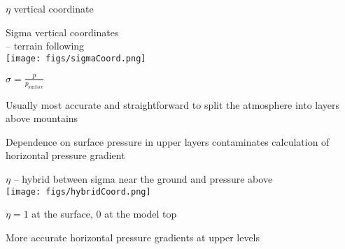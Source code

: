 \begin{slide}

\begin{list1}
\item $\eta$ vertical coordinate

\begin{minipage}[t]{0.48\linewidth}\centering
Sigma vertical coordinates \\ \hspace{1cm}-- terrain following \\
\texttt{[image: figs/sigmaCoord.png]}
\begin{list2}
\item $\sigma=\frac{p}{p_\text{surface}}$ \\
\item Usually most accurate and straightforward to split the atmosphere into layers above mountains
\item Dependence on surface pressure in upper layers contaminates calculation of horizontal pressure gradient
\end{list2}
\end{minipage}
\hfill
\begin{minipage}[t]{0.48\linewidth}\centering
$\eta$ -- hybrid between sigma near the ground and pressure above\\
\texttt{[image: figs/hybridCoord.png]}
\begin{list2}
\item $\eta = 1$ at the surface, $0$ at the model top
\item More accurate horizontal pressure gradients at upper levels
\end{list2}

\end{minipage}
\end{list1}
\end{slide}

